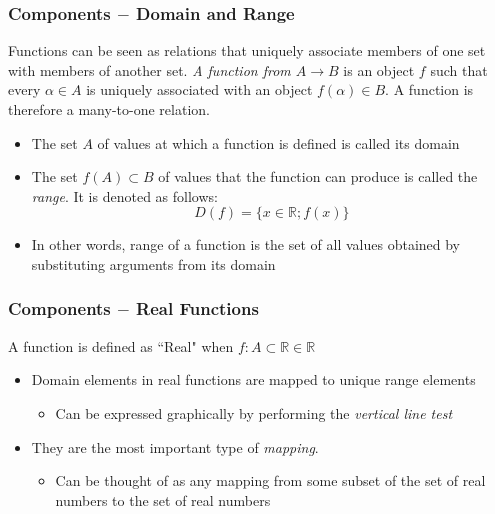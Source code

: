 \documentclass{beamer}
\begin{document}
\begin{frame}[fragile]\frametitle{Components $-$ Domain and Range}

Functions can be seen as relations that uniquely associate members of one set with members of another set. \textit{A function from $A \to B$} is an object $f$ such that every $\alpha \in A$ is uniquely associated with an object $f(\alpha) \in B$. A function is therefore a many-to-one relation.

\vfill
\begin{itemize}
  \item The set $A$ of values at which a function is defined is called its domain
  \item The set $f(A) \subset B$ of values that the function can produce is called the \textit{range}. It is denoted as follows:
  \begin{equation*}
    D(f) = \lbrace x \in \mathbb{R}; f(x) \rbrace
  \end{equation*}
  \item In other words, range of a function is the set of all values obtained by substituting arguments from its domain

\end{itemize}

\end{frame}

\begin{frame}[fragile]\frametitle{Components $-$ Real Functions}

A function is defined as ``Real" when $f: A \subset \mathbb{R} \in \mathbb{R}$
\vfill
\begin{itemize}
  \item Domain elements in real functions are mapped to unique range elements
  \begin{itemize}
    \item Can be expressed graphically by performing the \textit{vertical line test}
  \end{itemize}
  \item They are the most important type of \textit{mapping}.
  \begin{itemize}
    \item Can be thought of as any mapping from some subset of the set of real numbers to the set of real numbers
  \end{itemize}
  
\end{itemize}

\end{frame}
\end{document}
